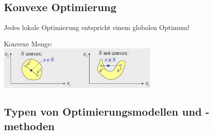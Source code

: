 \subsection{Konvexe Optimierung }
  Jedes lokale Optimierung entspricht einem globalen Optimum!
  
  Konvexe Menge:\\
  \includegraphics[width=8cm]{./Content/OptMathModels/ConvexSet}

\subsection{Typen von Optimierungsmodellen und -methoden }

